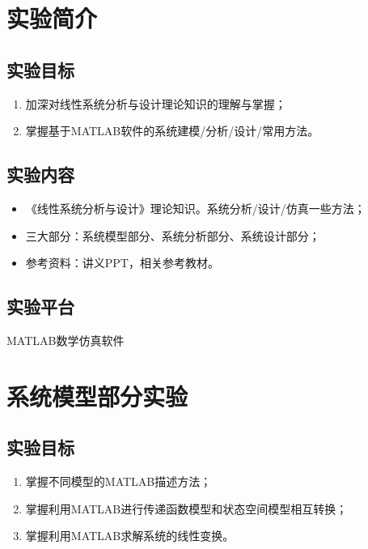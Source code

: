 \documentclass[UTF8]{article}
\begin{document}
\begin{titlepage}

\end{titlepage}

\tableofcontents
\cleardoublepage

%
\section{实验简介}
\subsection{实验目标}

\begin{enumerate}
    \item 加深对线性系统分析与设计理论知识的理解与掌握；
    \item 掌握基于MATLAB软件的系统建模/分析/设计/常用方法。
\end{enumerate}

\subsection{实验内容}

\begin{itemize}
    \item 《线性系统分析与设计》理论知识。系统分析/设计/仿真一些方法；
    \item 三大部分：系统模型部分、系统分析部分、系统设计部分；
    \item 参考资料：讲义PPT，相关参考教材。
\end{itemize}


\subsection{实验平台}

MATLAB数学仿真软件


\section{系统模型部分实验}
\subsection{实验目标}

\begin{enumerate}
    \item 掌握不同模型的MATLAB描述方法；
    \item 掌握利用MATLAB进行传递函数模型和状态空间模型相互转换；
    \item 掌握利用MATLAB求解系统的线性变换。
\end{enumerate}
\end{document}
